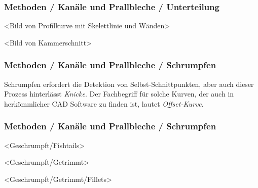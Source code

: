 \documentclass[8pt, aspectratio=169]{beamer}
\begin{document}
\begin{frame}
	\frametitle{Methoden / Kanäle und Prallbleche / Unterteilung}
	\vspace{-1cm}\hspace{-0.5cm}
	\begin{minipage}[t]{.69\textwidth}
		\centering
		<Bild von Profilkurve mit Skelettlinie und Wänden>
	\end{minipage}
	\begin{minipage}[t]{.29\textwidth}
		\centering
		<Bild von Kammerschnitt>
	\end{minipage}
\end{frame}

\begin{frame}
	\frametitle{Methoden / Kanäle und Prallbleche / Schrumpfen}
	\vspace{-1cm}\hspace{-0.5cm}
	\begin{minipage}[t]{\textwidth}
		Schrumpfen erfordert die Detektion von Selbst-Schnittpunkten, aber auch dieser Prozess hinterlässt \emph{Knicke}.
		Der Fachbegriff für solche Kurven, der auch in herkömmlicher CAD Software zu finden ist, lautet \emph{Offset-Kurve}.
	\end{minipage}
	\begin{figure}[H]
		\centering
		\begin{subfigure}{0.49\textwidth}
			
		\end{subfigure}
		\begin{subfigure}{0.49\textwidth}
			
		\end{subfigure}
	\end{figure}
\end{frame}

\begin{frame}
	\frametitle{Methoden / Kanäle und Prallbleche / Schrumpfen}
	\vspace{-1cm}\hspace{-0.5cm}
	\begin{minipage}[t]{.32\textwidth}
		\centering
		<Geschrumpft/Fishtails>
	\end{minipage}
	\begin{minipage}[t]{.32\textwidth}
		\centering
		<Geschrumpft/Getrimmt>
	\end{minipage}
	\begin{minipage}[t]{.32\textwidth}
		\centering
		<Geschrumpft/Getrimmt/Fillets>
	\end{minipage}
\end{frame}
\end{document}
